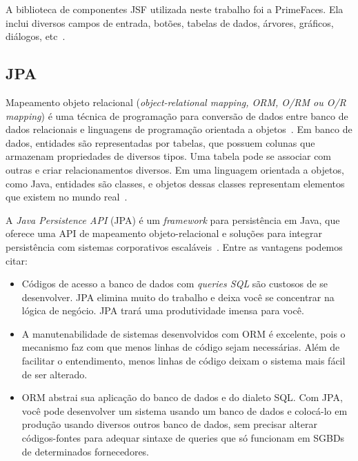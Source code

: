 A biblioteca de componentes JSF utilizada neste trabalho foi a PrimeFaces. Ela inclui diversos campos de entrada, botões, tabelas de dados, árvores, gráficos, diálogos, etc~\cite{thiagoJava}.





\subsection{JPA}
\label{sec-referencial-desenvolvimento-web-JPA}

Mapeamento objeto relacional (\textit{object-relational mapping, ORM, O/RM ou O/R mapping}) é uma técnica de programação para conversão de dados entre banco de dados relacionais e linguagens de programação orientada a objetos~\cite{thiagoJava}.
Em banco de dados, entidades são representadas por tabelas, que possuem colunas que armazenam propriedades de diversos tipos. Uma tabela pode se associar com outras e criar relacionamentos diversos.
Em uma linguagem orientada a objetos, como Java, entidades são classes, e objetos dessas classes representam elementos que existem no mundo real~\cite{thiagoJava}.

A \textit{Java Persistence API} (JPA) é um \textit{framework} para persistência em Java, que oferece uma API de mapeamento objeto-relacional e soluções para integrar persistência com sistemas corporativos escaláveis~\cite{thiagoJava}. Entre as vantagens podemos citar:

\begin{itemize}
	\item Códigos de acesso a banco de dados com \textit{queries SQL} são custosos de se desenvolver. JPA elimina muito do trabalho e deixa você se concentrar na lógica de negócio. JPA trará uma produtividade imensa para você.
	\item A manutenabilidade de sistemas desenvolvidos com ORM é excelente, pois o mecanismo faz com que menos linhas de código sejam necessárias. Além de facilitar o entendimento, menos linhas de código deixam o sistema mais fácil de ser alterado.
	\item ORM abstrai sua aplicação do banco de dados e do dialeto SQL. Com JPA, você pode desenvolver um sistema usando um banco de dados e colocá-lo em produção usando diversos outros banco de dados, sem precisar alterar códigos-fontes para adequar sintaxe de queries que só funcionam em SGBDs de determinados fornecedores.
\end{itemize}

